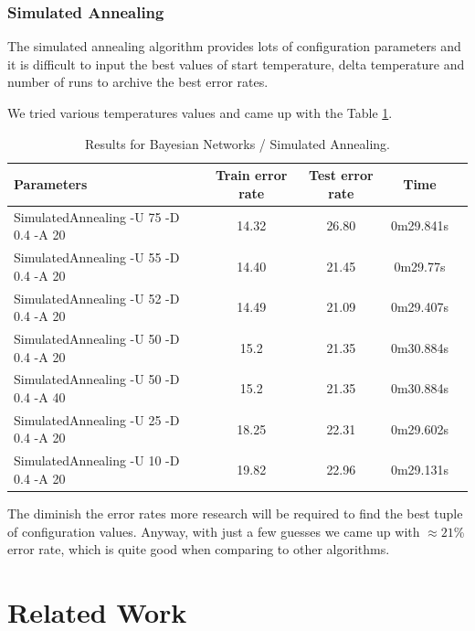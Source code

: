 \documentclass[a4paper]{llncs}
\begin{document}
\subsubsection{Simulated Annealing}

The simulated annealing algorithm provides lots of configuration parameters
and it is difficult to input the best values of start temperature, delta
temperature and number of runs to archive the best error rates.

We tried various temperatures values and came up with the Table \ref{tbl:results_bayesian_networks_sa}.

\begin{table}[ht]
  \begin{center}
  \begin{tabular}{ | l | c | c | c | c |}
    \hline
    \textbf{Parameters} & \textbf{Train error rate} & \textbf{Test error rate} & \textbf{Time} \\ \hline
    SimulatedAnnealing -U 75 -D 0.4 -A 20 & 14.32 & 26.80 & 0m29.841s \\ \hline
    SimulatedAnnealing -U 55 -D 0.4 -A 20 & 14.40 & 21.45 & 0m29.77s \\ \hline
    SimulatedAnnealing -U 52 -D 0.4 -A 20 & 14.49 & 21.09 & 0m29.407s \\ \hline
    SimulatedAnnealing -U 50 -D 0.4 -A 20 & 15.2 & 21.35 & 0m30.884s \\ \hline
    SimulatedAnnealing -U 50 -D 0.4 -A 40 & 15.2 & 21.35 & 0m30.884s \\ \hline
    SimulatedAnnealing -U 25 -D 0.4 -A 20 & 18.25 & 22.31 & 0m29.602s \\ \hline
    SimulatedAnnealing -U 10 -D 0.4 -A 20 & 19.82 & 22.96 & 0m29.131s \\ \hline
  \end{tabular}
  \caption{Results for Bayesian Networks / Simulated Annealing.}
  \label{tbl:results_bayesian_networks_sa}
  \end{center}
\end{table}

The diminish the error rates more research will be required to find the best
tuple of configuration values. Anyway, with just a few guesses we came up
with $\approx21$\% error rate, which is quite good when comparing to other algorithms.

\section{Related Work}
\end{document}

